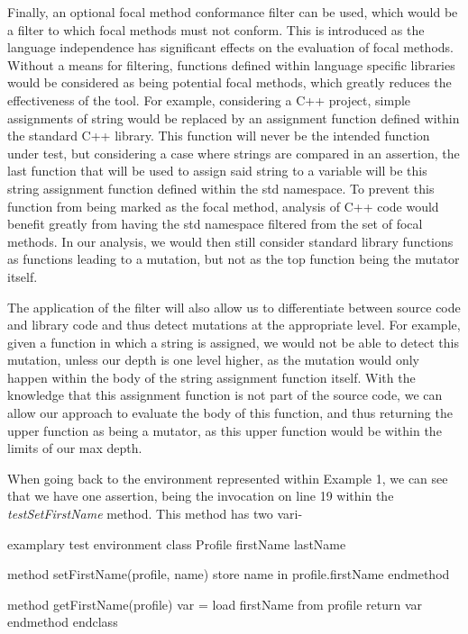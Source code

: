 \documentclass[11pt]{article}
\begin{document}
\begin{multicols}{2}
Finally, an optional focal method conformance filter can be used, which would be a filter to which focal methods must not conform. This is introduced as the language independence has significant effects on the evaluation of focal methods. Without a means for filtering, functions defined within language specific libraries would be considered as being potential focal methods, which greatly reduces the effectiveness of the tool. For example, considering a C++ project, simple assignments of string would be replaced by an assignment function defined within the standard C++ library. This function will never be the intended function under test, but considering a case where strings are compared in an assertion, the last function that will be used to assign said string to a variable will be this string assignment function defined within the std namespace. To prevent this function from being marked as the focal method, analysis of C++ code would benefit greatly from having the std namespace filtered from the set of focal methods. In our analysis, we would then still consider standard library functions as functions leading to a mutation, but not as the top function being the mutator itself.

The application of the filter will also allow us to differentiate between source code and library code and thus detect mutations at the appropriate level. For example, given a function in which a string is assigned, we would not be able to detect this mutation, unless our depth is one level higher, as the mutation would only happen within the body of the string assignment function itself. With the knowledge that this assignment function is not part of the source code, we can allow our approach to evaluate the body of this function, and thus returning the upper function as being a mutator, as this upper function would be within the limits of our max depth.

When going back to the environment represented within Example 1, we can see that we have one assertion, being the invocation on line 19 within the \textit{testSetFirstName} method. This method has two vari-

\begin{sexylisting}{examplary test environment\label{lst:example1}}
class Profile
  firstName
  lastName
	
  method setFirstName(profile, name)
    store name in profile.firstName
  endmethod
	
  method getFirstName(profile)
    var = load firstName from profile
    return var
  endmethod
endclass
	

\end{sexylisting}
\end{multicols}
\end{document}
